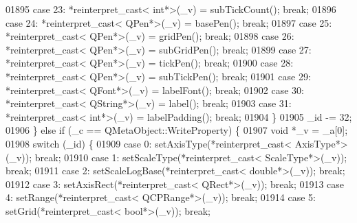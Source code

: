 \begin{DoxyCode}
01895         \textcolor{keywordflow}{case} 23: *\textcolor{keyword}{reinterpret\_cast<} \textcolor{keywordtype}{int}*\textcolor{keyword}{>}(\_v) = subTickCount(); \textcolor{keywordflow}{break};
01896         \textcolor{keywordflow}{case} 24: *\textcolor{keyword}{reinterpret\_cast<} QPen*\textcolor{keyword}{>}(\_v) = basePen(); \textcolor{keywordflow}{break};
01897         \textcolor{keywordflow}{case} 25: *\textcolor{keyword}{reinterpret\_cast<} QPen*\textcolor{keyword}{>}(\_v) = gridPen(); \textcolor{keywordflow}{break};
01898         \textcolor{keywordflow}{case} 26: *\textcolor{keyword}{reinterpret\_cast<} QPen*\textcolor{keyword}{>}(\_v) = subGridPen(); \textcolor{keywordflow}{break};
01899         \textcolor{keywordflow}{case} 27: *\textcolor{keyword}{reinterpret\_cast<} QPen*\textcolor{keyword}{>}(\_v) = tickPen(); \textcolor{keywordflow}{break};
01900         \textcolor{keywordflow}{case} 28: *\textcolor{keyword}{reinterpret\_cast<} QPen*\textcolor{keyword}{>}(\_v) = subTickPen(); \textcolor{keywordflow}{break};
01901         \textcolor{keywordflow}{case} 29: *\textcolor{keyword}{reinterpret\_cast<} QFont*\textcolor{keyword}{>}(\_v) = labelFont(); \textcolor{keywordflow}{break};
01902         \textcolor{keywordflow}{case} 30: *\textcolor{keyword}{reinterpret\_cast<} QString*\textcolor{keyword}{>}(\_v) = label(); \textcolor{keywordflow}{break};
01903         \textcolor{keywordflow}{case} 31: *\textcolor{keyword}{reinterpret\_cast<} \textcolor{keywordtype}{int}*\textcolor{keyword}{>}(\_v) = labelPadding(); \textcolor{keywordflow}{break};
01904         \}
01905         \_id -= 32;
01906     \} \textcolor{keywordflow}{else} \textcolor{keywordflow}{if} (\_c == QMetaObject::WriteProperty) \{
01907         \textcolor{keywordtype}{void} *\_v = \_a[0];
01908         \textcolor{keywordflow}{switch} (\_id) \{
01909         \textcolor{keywordflow}{case} 0: setAxisType(*reinterpret\_cast< AxisType*>(\_v)); \textcolor{keywordflow}{break};
01910         \textcolor{keywordflow}{case} 1: setScaleType(*reinterpret\_cast< ScaleType*>(\_v)); \textcolor{keywordflow}{break};
01911         \textcolor{keywordflow}{case} 2: setScaleLogBase(*reinterpret\_cast< double*>(\_v)); \textcolor{keywordflow}{break};
01912         \textcolor{keywordflow}{case} 3: setAxisRect(*reinterpret\_cast< QRect*>(\_v)); \textcolor{keywordflow}{break};
01913         \textcolor{keywordflow}{case} 4: setRange(*reinterpret\_cast< QCPRange*>(\_v)); \textcolor{keywordflow}{break};
01914         \textcolor{keywordflow}{case} 5: setGrid(*reinterpret\_cast< bool*>(\_v)); \textcolor{keywordflow}{break};

\end{DoxyCode}
